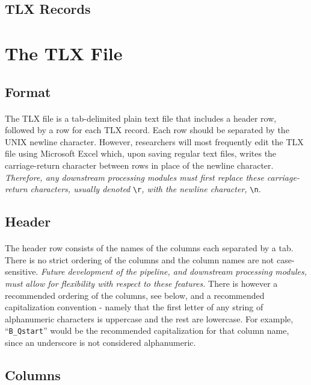 \documentclass{article}
\begin{document}
\subsection*{TLX Records}


\section{The TLX File}

\subsection*{Format}
\paragraph{} The TLX file is a tab-delimited plain text file that includes a header row, followed by a row for each TLX record. Each row should be separated by the UNIX newline character. However, researchers will most frequently edit the TLX file using Microsoft Excel which, upon saving regular text files, writes the carriage-return character between rows in place of the newline character. \emph{Therefore, any downstream processing modules must first replace these carriage-return characters, usually denoted} \texttt{\textbackslash{}r}\emph{, with the newline character,} \texttt{\textbackslash{}n}\emph{.}

\subsection*{Header}
\paragraph{} The header row consists of the names of the columns each separated by a tab. There is no strict ordering of the columns and the column names are not case-sensitive. \emph {Future development of the pipeline, and downstream processing modules, must allow for flexibility with respect to these features.} There is however a recommended ordering of the columns, see below, and a recommended capitalization convention - namely that the first letter of any string of alphanumeric characters is uppercase and the rest are lowercase. For example, ``\texttt{B\_Qstart}'' would be the recommended capitalization for that column name, since an underscore is not considered alphanumeric.


\subsection*{Columns}
\end{document}
